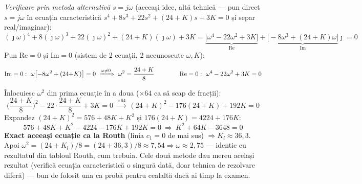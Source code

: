 \documentclass[10pt,a4paper]{article}
\newcommand{\tip}[1]{\textcolor{blue!55!black}{#1}}
\begin{document}
\textit{Verificare prin metoda alternativă} $s{=}j\omega$ (aceeași idee, altă tehnică — pun direct $s{=}j\omega$ în ecuația caracteristică $s^4{+}8s^3{+}22s^2{+}(24{+}K)s{+}3K{=}0$ și separ real/imaginar):
$$(\jmath\omega)^4+8(\jmath\omega)^3+22(\jmath\omega)^2+(24{+}K)(\jmath\omega)+3K=\underbrace{\big[\omega^4-22\omega^2+3K\big]}_{\text{Re}}+\underbrace{\big[{-}8\omega^3+(24{+}K)\omega\big]}_{\text{Im}}\jmath=0$$
Pun Re$=0$ și Im$=0$ (sistem de 2 ecuații, 2 necunoscute $\omega,K$):
\begin{keyeq}\color{red!65!black}
$$\text{Im}=0:\ \omega\big[{-}8\omega^2+(24{+}K)\big]=0\ \xRightarrow{\omega\ne0}\ \omega^2=\dfrac{24+K}8\qquad\qquad \text{Re}=0:\ \omega^4-22\omega^2+3K=0$$
\end{keyeq}
Înlocuiesc $\omega^2$ din prima ecuație în a doua ($\times64$ ca să scap de fracții):
$$\Big(\dfrac{24{+}K}8\Big)^2-22\cdot\dfrac{24{+}K}8+3K=0\ \xrightarrow{\times64}\ (24{+}K)^2-176(24{+}K)+192K=0$$
Expandez $(24{+}K)^2=576{+}48K{+}K^2$ și $176(24{+}K)=4224{+}176K$:
$$576{+}48K{+}K^2-4224-176K+192K=0\ \Rightarrow\ K^2+64K-3648=0$$
\textbf{Exact aceeași ecuație ca la Routh} (linia $c_1{=}0$ de mai sus) $\Rightarrow K_l\approx36{,}3$. Apoi $\omega^2=(24{+}K_l)/8=(24{+}36{,}3)/8\approx7{,}54\Rightarrow\omega\approx2{,}75$ — identic cu rezultatul din tabloul Routh, cum trebuia.
\tip{Cele două metode dau mereu același rezultat (verifică ecuația caracteristică o singură dată, doar tehnica de rezolvare diferă) — bun de folosit una ca probă pentru cealaltă dacă ai timp la examen.}
\end{document}
